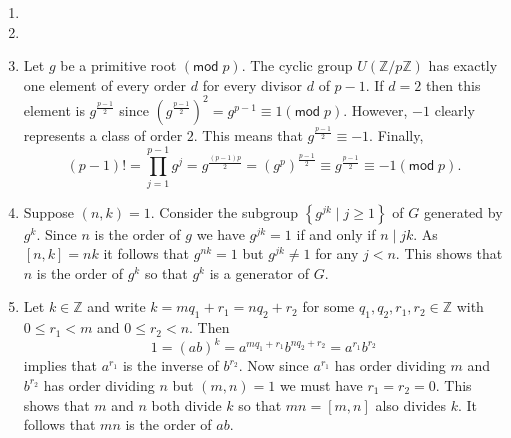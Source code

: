 \documentclass[12pt]{article}
\renewcommand{\pmod}[1]{\left(\mathsf{mod}\;#1\right)}
\begin{document}
\begin{enumerate}
\item %
\item %
\item Let $g$ be a primitive root $\pmod{p}$.
The cyclic group $U\left(\mathbb{Z}/p\mathbb{Z}\right)$
has exactly one element of every order $d$ for every divisor
$d$ of $p-1$. If $d=2$ then this element is $g^{\frac{p-1}{2}}$
since $\left(g^{\frac{p-1}{2}}\right)^2=g^{p-1}\equiv 1\pmod{p}$.
However, $-1$ clearly represents a class of order $2$.
This means that $g^{\frac{p-1}{2}}\equiv -1$.
Finally,
\[\left(p-1\right)!=\prod_{j=1}^{p-1}g^j
=g^{\frac{\left(p-1\right)p}{2}}
=\left(g^p\right)^{\frac{p-1}{2}}
\equiv g^{\frac{p-1}{2}}
\equiv -1\pmod{p}.\]

\item\label{CyclicGenerators} %
Suppose $\left(n,k\right)=1$.
Consider the subgroup 
$\left\{g^{jk}\mid j\ge 1\right\}$
of $G$ generated by $g^k$.
Since $n$ is the order of $g$ we have $g^{jk}=1$
if and only if $n\mid jk$. As $\left[n,k\right]=nk$
it follows that $g^{nk}=1$ but $g^{jk}\ne 1$ for any $j<n$.
This shows that $n$ is the order of $g^k$
so that $g^k$ is a generator of $G$.

\item %
Let $k\in\mathbb{Z}$ and write $k=mq_1+r_1=nq_2+r_2$ for
some $q_1,q_2,r_1,r_2\in\mathbb{Z}$ with $0\le r_1<m$ and $0\le r_2<n$. Then 
\[1=\left(ab\right)^k=a^{mq_1+r_1}b^{nq_2+r_2}=a^{r_1}b^{r_2}\]
implies that $a^{r_1}$ is the inverse of $b^{r_2}$.
Now since $a^{r_1}$ has order dividing $m$ and $b^{r_2}$
has order dividing $n$ but $\left(m,n\right)=1$ we must
have $r_1=r_2=0$. This shows that $m$ and $n$ both divide $k$
so that $mn=\left[m,n\right]$ also divides $k$. It follows
that $mn$ is the order of $ab$.
\end{enumerate}
\end{document}

